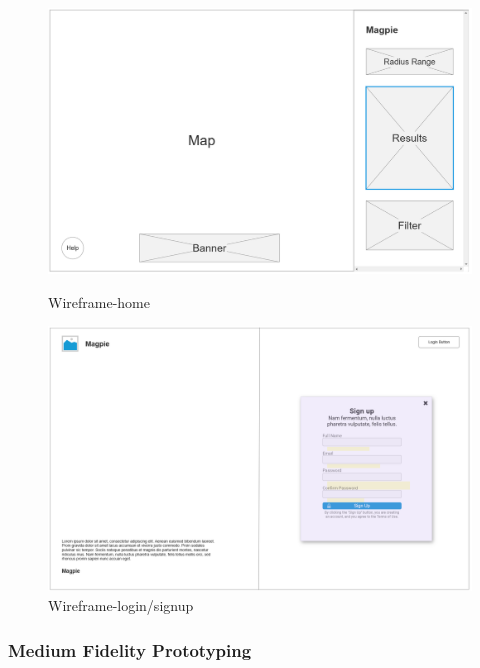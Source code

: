 \begin{figure}[h]
    \centering
    \begin{minipage}{0.48\textwidth}
        \centering
        \includegraphics[width=\textwidth]{images/wireframe-home.jpg}
        \caption{Wireframe-home}
        \label{fig:wireframe-home}
    \end{minipage}
    \hfill
    \begin{minipage}{0.48\textwidth}
        \centering
        \includegraphics[width=\textwidth]{images/wireframe-signup.jpg}
        \caption{Wireframe-login/signup}
        \label{fig:wireframe-signup}
    \end{minipage}
\end{figure}

\subsubsection{Medium Fidelity Prototyping}

